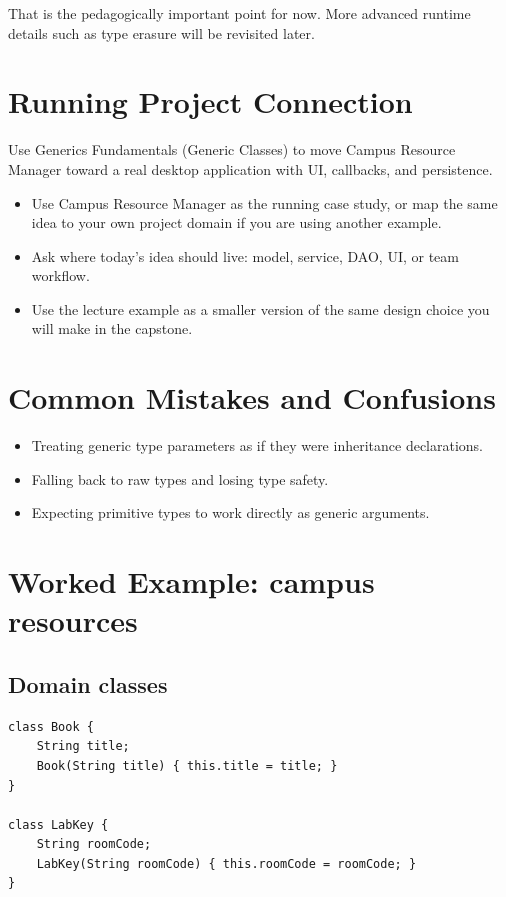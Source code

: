 \documentclass[11pt]{article}
\begin{document}
That is the pedagogically important point for now.
More advanced runtime details such as type erasure will be revisited later.
\notesources{\OOPSUnitIVSources}

\section{Running Project Connection}
Use Generics Fundamentals (Generic Classes) to move Campus Resource Manager toward a real desktop application with UI, callbacks, and persistence.
\begin{itemize}
  \item Use Campus Resource Manager as the running case study, or map the same idea to your own project domain if you are using another example.
  \item Ask where today's idea should live: model, service, DAO, UI, or team workflow.
  \item Use the lecture example as a smaller version of the same design choice you will make in the capstone.
\end{itemize}
\notesources{\OOPSUnitIVSources}

\section{Common Mistakes and Confusions}
\begin{itemize}
  \item Treating generic type parameters as if they were inheritance declarations.
  \item Falling back to raw types and losing type safety.
  \item Expecting primitive types to work directly as generic arguments.
\end{itemize}
\notesources{\OOPSUnitIVSources}

\section{Worked Example: campus resources}
\subsection*{Domain classes}
\begin{lstlisting}
class Book {
    String title;
    Book(String title) { this.title = title; }
}

class LabKey {
    String roomCode;
    LabKey(String roomCode) { this.roomCode = roomCode; }
}
\end{lstlisting}
\end{document}
